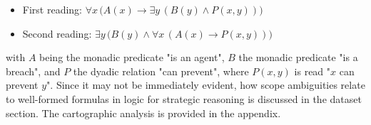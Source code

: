 \begin{itemize}
    \item[-] First reading: $\forall x \, \bigl(A(x) \rightarrow \exists y \, (B(y) \land P(x, y))\bigr)$
    \item[-] Second reading: $\exists y \, \bigl(B(y) \land \forall x \, (A(x) \rightarrow P(x, y))\bigr)$
\end{itemize}
with $A$ being the monadic predicate "is an agent", $B$ the monadic predicate "is a breach", and $P$ the dyadic relation "can prevent", where $P(x,y)$ is read "$x$ can prevent $y$". Since it may not be immediately evident, how scope ambiguities relate to well-formed formulas in logic for strategic reasoning is discussed in the dataset section. The cartographic analysis is provided in the appendix.

